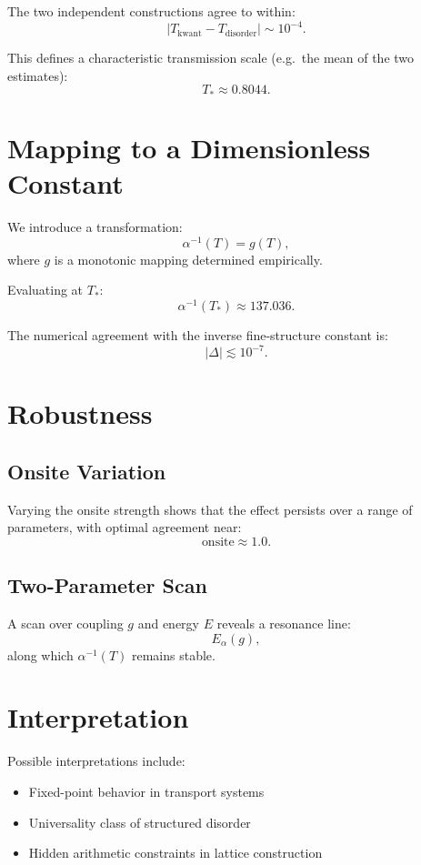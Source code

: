 \documentclass[11pt]{article}
\begin{document}
The two independent constructions agree to within:
\[
|T_{\text{kwant}} - T_{\text{disorder}}| \sim 10^{-4}.
\]

This defines a characteristic transmission scale (e.g.\ the mean of the two estimates):
\[
T_* \approx 0.8044.
\]

\section{Mapping to a Dimensionless Constant}

We introduce a transformation:
\begin{equation}
\alpha^{-1}(T) = g(T),
\end{equation}
where $g$ is a monotonic mapping determined empirically.

Evaluating at $T_*$:
\[
\alpha^{-1}(T_*) \approx 137.036.
\]

The numerical agreement with the inverse fine-structure constant is:
\[
|\Delta| \lesssim 10^{-7}.
\]

\section{Robustness}

\subsection{Onsite Variation}

Varying the onsite strength shows that the effect persists over a range of parameters, with optimal agreement near:
\[
\text{onsite} \approx 1.0.
\]

\subsection{Two-Parameter Scan}

A scan over coupling $g$ and energy $E$ reveals a resonance line:
\[
E_\alpha(g),
\]
along which $\alpha^{-1}(T)$ remains stable.

\section{Interpretation}

Possible interpretations include:

\begin{itemize}
\item Fixed-point behavior in transport systems
\item Universality class of structured disorder
\item Hidden arithmetic constraints in lattice construction
\end{itemize}
\end{document}
